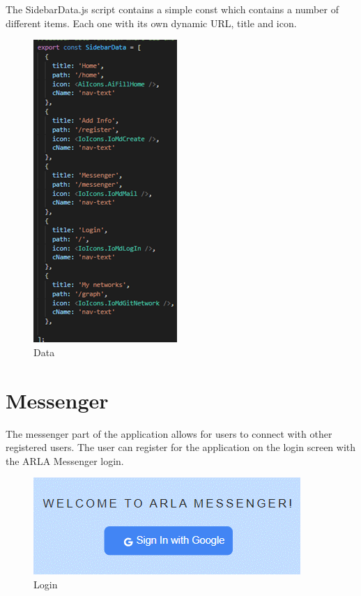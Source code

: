 The SidebarData.js script contains a simple const which contains a number of different items. Each one with its own dynamic URL, title and icon. \\
\begin{figure}[H]
    \centering
    \includegraphics{img/nav5.png}
    \caption{Data} 
    \label{fig:my_label}
\end{figure}

\section{Messenger}

The messenger part of the application allows for users to connect with other registered users. The user can register for the application on the login screen with the ARLA Messenger login. \\
\begin{figure}[H]
    \centering
    \includegraphics{img/messenger1.png}
    \caption{Login} 
    \label{fig:my_label}
\end{figure}

